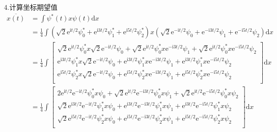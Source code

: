 4.计算坐标期望值
\begin{equation}
    \begin{aligned}
        \overline{x(t)}&=\int{\psi ^*(t)x\psi (t)\mathrm{d}x}
\\
&=\frac{1}{4}\int{\left( \sqrt{2}\mathrm{e}^{\mathrm{i}t/2}\psi _{0}^{*}+\mathrm{e}^{\mathrm{i}3t/2}\psi _{1}^{*}+\mathrm{e}^{\mathrm{i}5t/2}\psi _{2}^{*} \right) x\left( \sqrt{2}\mathrm{e}^{-\mathrm{i}t/2}\psi _0+\mathrm{e}^{-\mathrm{i}3t/2}\psi _1+\mathrm{e}^{-\mathrm{i}5t/2}\psi _2 \right) \mathrm{d}x}
\\
&=\frac{1}{4}\int{\left[ \begin{array}{c}
	\sqrt{2}\mathrm{e}^{\mathrm{i}t/2}\psi _{0}^{*}x\sqrt{2}\mathrm{e}^{-\mathrm{i}t/2}\psi _0+\sqrt{2}\mathrm{e}^{\mathrm{i}t/2}\psi _{0}^{*}x\mathrm{e}^{-\mathrm{i}3t/2}\psi _1+\sqrt{2}\mathrm{e}^{\mathrm{i}t/2}\psi _{0}^{*}x\mathrm{e}^{-\mathrm{i}5t/2}\psi _2\\
	\mathrm{e}^{\mathrm{i}3t/2}\psi _{1}^{*}x\sqrt{2}\mathrm{e}^{-\mathrm{i}t/2}\psi _0+\mathrm{e}^{\mathrm{i}3t/2}\psi _{1}^{*}x\mathrm{e}^{-\mathrm{i}3t/2}\psi _1+\mathrm{e}^{\mathrm{i}3t/2}\psi _{1}^{*}x\mathrm{e}^{-\mathrm{i}5t/2}\psi _2\\
	\mathrm{e}^{\mathrm{i}5t/2}\psi _{2}^{*}x\sqrt{2}\mathrm{e}^{-\mathrm{i}t/2}\psi _0+\mathrm{e}^{\mathrm{i}5t/2}\psi _{2}^{*}x\mathrm{e}^{-\mathrm{i}3t/2}\psi _1+\mathrm{e}^{\mathrm{i}5t/2}\psi _{2}^{*}x\mathrm{e}^{-\mathrm{i}5t/2}\psi _2\\
\end{array} \right] \mathrm{d}x}
\\
&=\frac{1}{4}\int{\left[ \begin{array}{c}
	2\mathrm{e}^{\mathrm{i}t/2}\mathrm{e}^{-\mathrm{i}t/2}\psi _{0}^{*}x\psi _0+\sqrt{2}\mathrm{e}^{\mathrm{i}t/2}\mathrm{e}^{-\mathrm{i}3t/2}\psi _{0}^{*}x\psi _1+\sqrt{2}\mathrm{e}^{\mathrm{i}t/2}\mathrm{e}^{-\mathrm{i}5t/2}\psi _{0}^{*}x\psi _2\\
	\sqrt{2}\mathrm{e}^{\mathrm{i}3t/2}\mathrm{e}^{-\mathrm{i}t/2}\psi _{1}^{*}x\psi _0+\mathrm{e}^{\mathrm{i}3t/2}\mathrm{e}^{-\mathrm{i}3t/2}\psi _{1}^{*}x\psi _1+\mathrm{e}^{\mathrm{i}3t/2}\mathrm{e}^{-\mathrm{i}5t/2}\psi _{1}^{*}x\psi _2\\
	\sqrt{2}\mathrm{e}^{\mathrm{i}5t/2}\mathrm{e}^{-\mathrm{i}t/2}\psi _{2}^{*}x\psi _0+\mathrm{e}^{\mathrm{i}5t/2}\mathrm{e}^{-\mathrm{i}3t/2}\psi _{2}^{*}x\psi _1+\mathrm{e}^{\mathrm{i}5t/2}\mathrm{e}^{-\mathrm{i}5t/2}\psi _{2}^{*}x\psi _2\\
\end{array} \right] \mathrm{d}x}

\end{aligned}
\end{equation}
